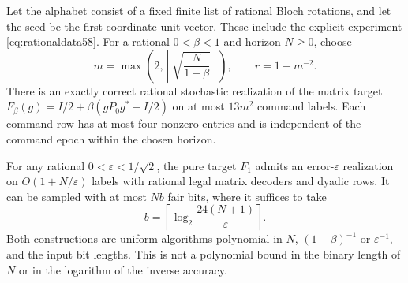 \begin{theorem}
\label{thm:rationalcompiler58}
Let the alphabet consist of a fixed finite list of rational Bloch
rotations, and let the seed be the first coordinate unit vector. These
include the explicit experiment \eqref{eq:rationaldata58}. For a rational
$0<\beta<1$ and horizon $N\ge0$, choose
\begin{equation}\label{eq:compilerparameters58}
 m=\max\left(2,\left\lceil\sqrt{\frac{N}{1-\beta}}\right\rceil\right),
                 \qquad r=1-m^{-2}.
\end{equation}
There is an exactly correct rational stochastic realization of the
matrix target
$F_\beta(g)=I/2+\beta(gP_0g^*-I/2)$ on at most $13m^2$ command labels.
Each command row has at most four nonzero entries and is independent
of the command epoch within the chosen horizon.

For any rational $0<\varepsilon<1/\sqrt2$, the pure target $F_1$ admits
an error-$\varepsilon$ realization on $O(1+N/\varepsilon)$ labels with
rational legal matrix decoders and dyadic rows. It can be sampled with
at most $Nb$ fair bits, where it suffices to take
\begin{equation}\label{eq:compilerbits58}
 b=\left\lceil\log_2\frac{24(N+1)}{\varepsilon}\right\rceil.
\end{equation}
Both constructions are uniform algorithms polynomial in $N$,
$(1-\beta)^{-1}$ or $\varepsilon^{-1}$, and the input bit lengths. This
is not a polynomial bound in the binary length of $N$ or in the logarithm of the inverse accuracy.
\end{theorem}

